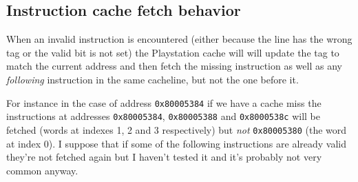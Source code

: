 \documentclass[a4paper]{article}
\newcommand{\code}[1] {\texttt{#1}}
\begin{document}
\subsection{Instruction cache fetch behavior}

When an invalid instruction is encountered (either because the line
has the wrong tag or the valid bit is not set) the Playstation cache
will will update the tag to match the current address and then fetch
the missing instruction as well as any \emph{following} instruction in
the same cacheline, but not the one before it.

For instance in the case of address \code{0x80005384} if we have a
cache miss the instructions at addresses \code{0x80005384},
\code{0x80005388} and \code{0x8000538c} will be fetched (words at
indexes 1, 2 and 3 respectively) but \emph{not} \code{0x80005380} (the
word at index 0). I suppose that if some of the following instructions
are already valid they're not fetched again but I haven't tested it
and it's probably not very common anyway.

\newpage

\listoftables
\listoffigures
\end{document}
